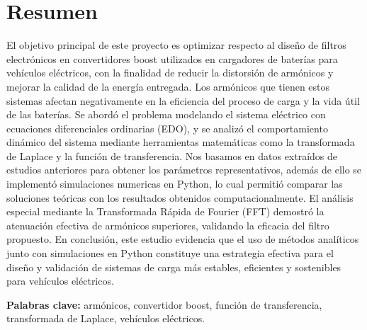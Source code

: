 \section {Resumen}
El objetivo principal de este proyecto es optimizar respecto al diseño de filtros electrónicos en convertidores boost utilizados en cargadores de baterías para vehículos eléctricos, con la finalidad de reducir la distorsión de armónicos y mejorar la calidad de la energía entregada. Los armónicos que tienen estos sistemas afectan negativamente en la eficiencia del proceso de carga y la vida útil de las baterías. Se abordó el problema modelando el sistema eléctrico con ecuaciones diferenciales ordinarias (EDO), y se analizó el comportamiento dinámico del sistema mediante herramientas matemáticas como la transformada de Laplace y la función de transferencia. Nos basamos en datos extraídos de estudios anteriores para obtener los parámetros representativos, además de ello se implementó simulaciones numericas en Python, lo cual permitió comparar las soluciones teóricas con los resultados obtenidos computacionalmente. El análisis especial mediante la Transformada Rápida de Fourier (FFT) demostró la atenuación efectiva de armónicos superiores, validando la eficacia del filtro propuesto. En conclusión, este estudio evidencia que el uso de métodos analíticos junto con simulaciones en Python constituye una estrategia efectiva para el diseño y validación de sistemas de carga más estables, eficientes y sostenibles para vehículos eléctricos.

\textbf{Palabras clave:} armónicos, convertidor boost, función de transferencia, transformada de Laplace, vehículos eléctricos.
